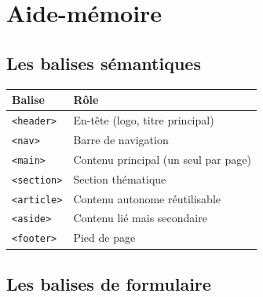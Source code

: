 \documentclass[11pt,a4paper]{article}
\begin{document}
\newpage

\section{Aide-mémoire}

\subsection{Les balises sémantiques}

\begin{center}
\begin{tabular}{@{}lp{7.5cm}@{}}
\toprule
\textbf{Balise}     & \textbf{Rôle} \\
\midrule
\texttt{<header>}   & En-tête (logo, titre principal) \\
\texttt{<nav>}      & Barre de navigation \\
\texttt{<main>}     & Contenu principal (un seul par page) \\
\texttt{<section>}  & Section thématique \\
\texttt{<article>}  & Contenu autonome réutilisable \\
\texttt{<aside>}    & Contenu lié mais secondaire \\
\texttt{<footer>}   & Pied de page \\
\bottomrule
\end{tabular}
\end{center}

\subsection{Les balises de formulaire}
\end{document}
